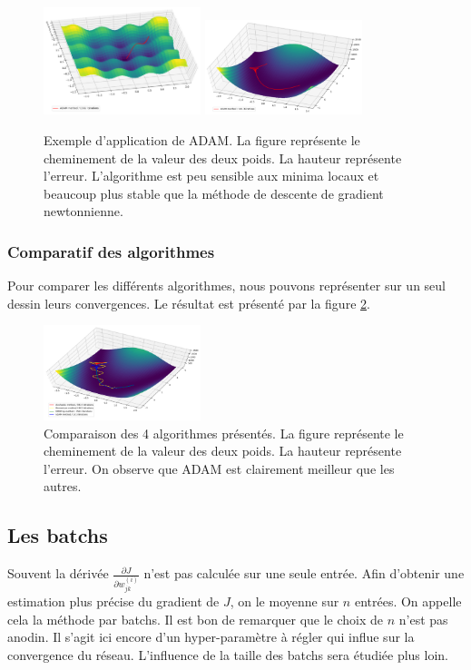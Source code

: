 \begin{figure}[!h]
\centering
\includegraphics[width=130pt]{"images/MLP/adam"}
\hspace*{10mm}
\includegraphics[width=130pt]{"images/MLP/adampropre"}
\caption{Exemple d'application de ADAM. La figure représente le cheminement de la valeur des deux poids. La hauteur représente l'erreur. L'algorithme est peu sensible aux minima locaux et beaucoup plus stable que la méthode de descente de gradient newtonnienne.}
\label{ADAM}
\end{figure}



\subsubsection{Comparatif des algorithmes}

Pour comparer les différents algorithmes, nous pouvons représenter sur un seul dessin leurs convergences. Le résultat est présenté par la figure \ref{Comparatifoptimiseurs}.

\begin{figure}[!h]
\centering
\includegraphics[width=130pt]{"images/MLP/comparatifoptimiseurs"}
\caption{Comparaison des 4 algorithmes présentés. La figure représente le cheminement de la valeur des deux poids. La hauteur représente l'erreur. On observe que ADAM est clairement meilleur que les autres.}
\label{Comparatifoptimiseurs}
\end{figure}

\subsection{Les batchs}
Souvent la dérivée $\frac{\partial J}{\partial w_{jk}^{(i)}}$ n'est pas calculée sur une seule entrée. Afin d'obtenir une estimation plus précise du gradient de $J$, on le moyenne sur $n$ entrées. On appelle cela la méthode par batchs. Il est bon de remarquer que le choix de $n$ n'est pas anodin. Il s'agit ici encore d'un hyper-paramètre à régler qui influe sur la convergence du réseau. L'influence de la taille des batchs sera étudiée plus loin.




